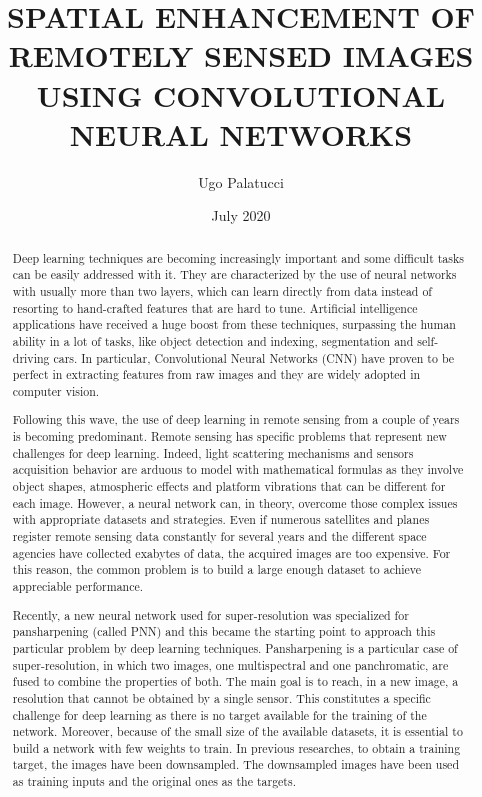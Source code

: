 \documentclass[notitlepage, 12pt]{report}
\title{SPATIAL ENHANCEMENT OF REMOTELY SENSED IMAGES USING CONVOLUTIONAL NEURAL NETWORKS}
\author{Ugo Palatucci}
\date{July 2020}
\begin{document}
\maketitle


\begin{abstract}
	Deep learning techniques are becoming increasingly important and
	some difficult tasks can be easily addressed with it.
	They are characterized by the use of neural networks with usually more than two layers, which can learn directly from data instead of resorting to hand-crafted features that are hard to tune.
	Artificial intelligence applications have received a huge boost from these techniques, surpassing the human ability in a lot of tasks, like object detection and indexing, segmentation and self-driving cars.
	In particular, Convolutional Neural Networks (CNN) have proven to be perfect in extracting features from raw images and they are widely adopted in computer vision.
	
	Following this wave, the use of deep learning in remote sensing from a couple of years is becoming predominant.
	Remote sensing has specific problems that represent new challenges for deep learning.
	Indeed, light scattering mechanisms and sensors acquisition behavior are arduous to model with mathematical formulas as they involve object shapes, atmospheric effects and platform vibrations that can be different for each image.
	However, a neural network can, in theory, overcome those complex issues with appropriate datasets and strategies.
	Even if numerous satellites and planes register remote sensing data constantly for several years and the different space agencies have collected exabytes of data, the acquired images are too expensive. 
	For this reason, the common problem is to build a large enough dataset to achieve appreciable performance.
	
	Recently, a new neural network used for super-resolution was specialized for pansharpening (called PNN) and this became the starting point to approach this particular problem by deep learning techniques. Pansharpening is a particular case of super-resolution, in which two images, one multispectral and one panchromatic, are fused to combine the properties of both. 
	The main goal is to reach, in a new image, a resolution that cannot be obtained by a single sensor. This constitutes a specific challenge for deep learning as there is no target available for the training of the network. Moreover, because of the small size of the available datasets, it is essential to build a network with few weights to train. 
	In previous researches, to obtain a training target, the images have been downsampled. The downsampled images have been used as training inputs and the original ones as the targets.
	

\end{abstract}
\end{document}
